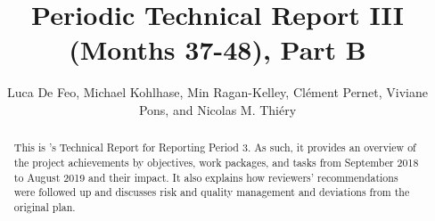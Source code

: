 \documentclass{deliverablereport}
\title[Periodic Technical Report III, Part B]{Periodic Technical Report III (Months 37-48), Part B}
\author{Luca De Feo, Michael Kohlhase, Min Ragan-Kelley, Clément
  Pernet, Viviane Pons, and Nicolas M. Thiéry}
\begin{document}
\oldmaketitle

\begin{abstract}
  This is \ODK's Technical Report for Reporting Period 3. As such, it
  provides an overview of the project achievements by objectives,
  work packages, and tasks from September 2018 to August 2019 and
  their impact. It also explains how reviewers' recommendations were
  followed up and discusses risk and quality management and deviations
  from the original plan.
\end{abstract}


\tableofcontents
\newpage












\clearpage
\printbibliography
\end{document}
